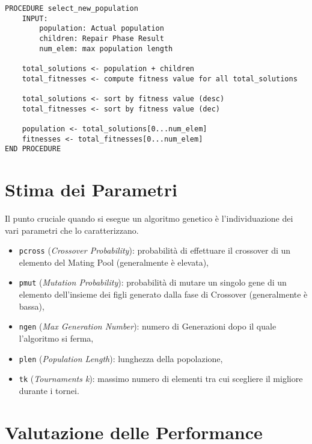 \begin{minipage}{\textwidth}
    \begin{lstlisting}
PROCEDURE select_new_population
    INPUT:
        population: Actual population
        children: Repair Phase Result
        num_elem: max population length

    total_solutions <- population + children
    total_fitnesses <- compute fitness value for all total_solutions

    total_solutions <- sort by fitness value (desc)
    total_fitnesses <- sort by fitness value (dec)

    population <- total_solutions[0...num_elem]
    fitnesses <- total_fitnesses[0...num_elem]
END PROCEDURE
\end{lstlisting}
\end{minipage}

\section{Stima dei Parametri}

Il punto cruciale quando si esegue un algoritmo genetico è l'individuazione dei
vari parametri che lo caratterizzano.

\begin{itemize}
    \item \verb|pcross| (\textit{Crossover Probability}): probabilità di
          effettuare il crossover di un elemento del Mating Pool (generalmente è
          elevata),
    \item \verb|pmut| (\textit{Mutation Probability}): probabilità di mutare un
          singolo gene di un elemento dell'insieme dei figli generato dalla fase
          di Crossover (generalmente è bassa),
    \item \verb|ngen| (\textit{Max Generation Number}): numero di Generazioni
          dopo il quale l'algoritmo si ferma,
    \item \verb|plen| (\textit{Population Length}): lunghezza della popolazione,
    \item \verb|tk| (\textit{Tournaments k}): massimo numero di elementi tra cui
          scegliere il migliore durante i tornei.
\end{itemize}



\section{Valutazione delle Performance}

